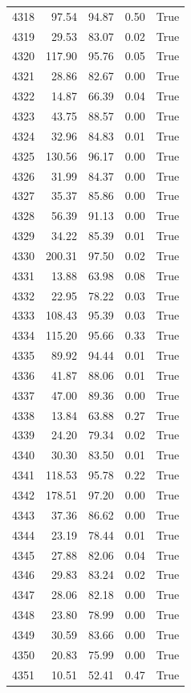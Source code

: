 \begin{longtable}{rrrrr}
4318 & 97.54 & 94.87 & 0.50 & True \\
4319 & 29.53 & 83.07 & 0.02 & True \\
4320 & 117.90 & 95.76 & 0.05 & True \\
4321 & 28.86 & 82.67 & 0.00 & True \\
4322 & 14.87 & 66.39 & 0.04 & True \\
4323 & 43.75 & 88.57 & 0.00 & True \\
4324 & 32.96 & 84.83 & 0.01 & True \\
4325 & 130.56 & 96.17 & 0.00 & True \\
4326 & 31.99 & 84.37 & 0.00 & True \\
4327 & 35.37 & 85.86 & 0.00 & True \\
4328 & 56.39 & 91.13 & 0.00 & True \\
4329 & 34.22 & 85.39 & 0.01 & True \\
4330 & 200.31 & 97.50 & 0.02 & True \\
4331 & 13.88 & 63.98 & 0.08 & True \\
4332 & 22.95 & 78.22 & 0.03 & True \\
4333 & 108.43 & 95.39 & 0.03 & True \\
4334 & 115.20 & 95.66 & 0.33 & True \\
4335 & 89.92 & 94.44 & 0.01 & True \\
4336 & 41.87 & 88.06 & 0.01 & True \\
4337 & 47.00 & 89.36 & 0.00 & True \\
4338 & 13.84 & 63.88 & 0.27 & True \\
4339 & 24.20 & 79.34 & 0.02 & True \\
4340 & 30.30 & 83.50 & 0.01 & True \\
4341 & 118.53 & 95.78 & 0.22 & True \\
4342 & 178.51 & 97.20 & 0.00 & True \\
4343 & 37.36 & 86.62 & 0.00 & True \\
4344 & 23.19 & 78.44 & 0.01 & True \\
4345 & 27.88 & 82.06 & 0.04 & True \\
4346 & 29.83 & 83.24 & 0.02 & True \\
4347 & 28.06 & 82.18 & 0.00 & True \\
4348 & 23.80 & 78.99 & 0.00 & True \\
4349 & 30.59 & 83.66 & 0.00 & True \\
4350 & 20.83 & 75.99 & 0.00 & True \\
4351 & 10.51 & 52.41 & 0.47 & True \\

\end{longtable}
